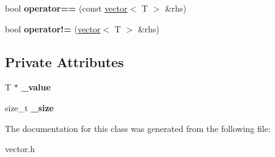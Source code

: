 \begin{DoxyCompactItemize}
\item 
\mbox{\label{classyanujz_1_1vector_a12fd3f96a48429653425813feaa69b29}} 
bool {\bfseries operator==} (const \mbox{\hyperlink{classyanujz_1_1vector}{vector}}$<$ T $>$ \&rhs)
\item 
\mbox{\label{classyanujz_1_1vector_a260121ff22a82eb25d56b6ed2e9b256d}} 
bool {\bfseries operator!=} (\mbox{\hyperlink{classyanujz_1_1vector}{vector}}$<$ T $>$ \&rhs)
\end{DoxyCompactItemize}
\subsection*{Private Attributes}
\begin{DoxyCompactItemize}
\item 
\mbox{\label{classyanujz_1_1vector_a1483399bbd46921c629ec261bb8121b2}} 
T $\ast$ {\bfseries \+\_\+value}
\item 
\mbox{\label{classyanujz_1_1vector_afffae7fe8ce95b099280e12652daf43c}} 
size\+\_\+t {\bfseries \+\_\+size}
\end{DoxyCompactItemize}


The documentation for this class was generated from the following file\+:\begin{DoxyCompactItemize}
\item 
vector.\+h\end{DoxyCompactItemize}
